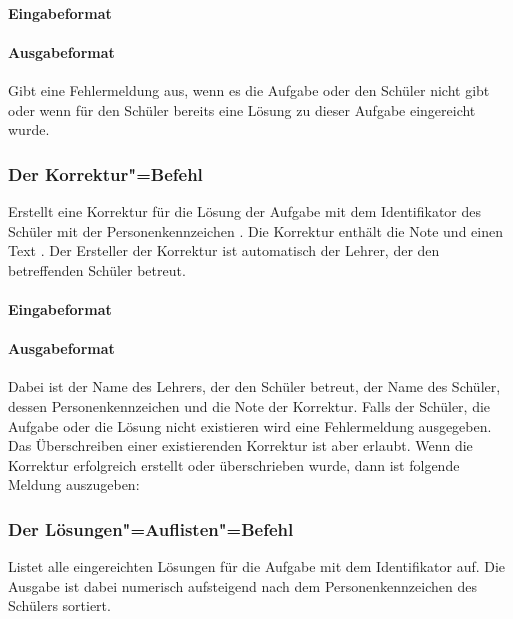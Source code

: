 \documentclass{sdqassignment}
\begin{document}
\paragraph{Eingabeformat}
\paragraph{Ausgabeformat}
Gibt eine Fehlermeldung aus, wenn es die Aufgabe oder den Schüler nicht gibt oder wenn für den Schüler bereits eine Lösung zu dieser Aufgabe eingereicht wurde.

\subsubsection{Der Korrektur"=Befehl}
Erstellt eine Korrektur für die Lösung der Aufgabe mit dem Identifikator  des Schüler mit der Personenkennzeichen . Die Korrektur enthält die Note  und einen Text . Der Ersteller der Korrektur ist automatisch der Lehrer, der den betreffenden Schüler betreut.
\paragraph{Eingabeformat}
\paragraph{Ausgabeformat}
Dabei ist  der Name des Lehrers, der den Schüler betreut,  der Name des Schüler,  dessen Personenkennzeichen und  die Note der Korrektur. Falls der Schüler, die Aufgabe oder die Lösung nicht existieren wird eine Fehlermeldung ausgegeben. Das Überschreiben einer existierenden Korrektur ist aber erlaubt. Wenn die Korrektur erfolgreich erstellt oder überschrieben wurde, dann ist folgende Meldung auszugeben:


\subsubsection{Der Lösungen"=Auflisten"=Befehl}
Listet alle eingereichten Lösungen für die Aufgabe mit dem Identifikator  auf. Die Ausgabe ist dabei numerisch aufsteigend nach dem Personenkennzeichen des Schülers sortiert.
\end{document}
